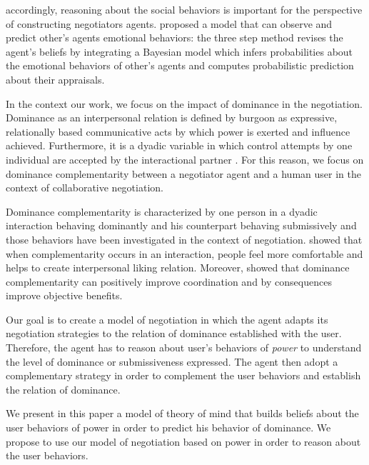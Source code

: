 \documentclass[conference, letterpaper]{IEEEtran}
\begin{document}
	
	accordingly, reasoning about the social behaviors is important for the perspective of constructing negotiators agents. \cite{alfonso2015emotional} proposed a model that can observe and predict other's agents emotional behaviors: the three step method revises the agent's  beliefs by integrating a Bayesian model which infers probabilities about the emotional behaviors of other's agents and computes probabilistic prediction about their appraisals.
	
	
	In the context our work, we focus on the impact of dominance in the negotiation. Dominance as an interpersonal relation is defined by burgoon \cite{burgoon1998nature} as expressive, relationally based communicative acts by which power is exerted and influence achieved. Furthermore, it is a dyadic variable in which control attempts by one individual are accepted by the
	interactional partner \cite{dunbar2005perceptions}. For this reason, we focus on dominance complementarity between a negotiator agent and a human user in the context of collaborative negotiation. 
	
	Dominance complementarity is characterized by one person in a dyadic interaction behaving dominantly and his counterpart behaving submissively \cite{tiedens2003power} and those behaviors have been investigated in the context of negotiation. \cite{tiedens2003power} showed that when complementarity occurs in an interaction, people feel more comfortable and helps to create interpersonal liking relation.
	Moreover, \cite{wiltermuth2015benefits} showed that dominance complementarity can positively improve coordination and by consequences improve objective benefits.
	
	Our goal is to create a model of negotiation in which the agent adapts its negotiation strategies to the relation of dominance established with the user. Therefore, the agent has to reason about user's behaviors of \emph{power} to understand the level of dominance or submissiveness expressed. The agent then adopt a complementary strategy in order to complement the user behaviors and establish the relation of dominance.
	
	We present in this paper a model of theory of mind that builds beliefs about the user behaviors of power in order to predict his behavior of dominance. We propose to use our model of negotiation based on power in order to reason about the user behaviors. 
	
\end{document}
